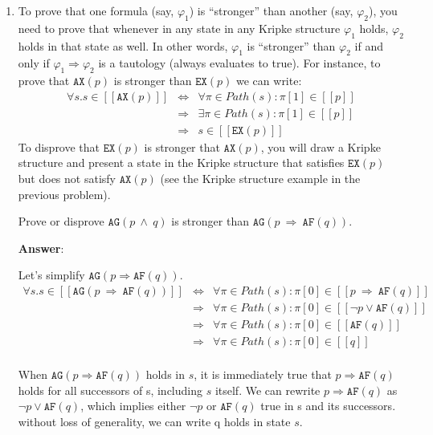 \documentclass[11pt]{article}
\newcommand{\ax}[1]{\texttt{AX}(#1)}
\newcommand{\ex}[1]{\texttt{EX}(#1)}
\newcommand{\af}[1]{\texttt{AF}(#1)}
\newcommand{\ag}[1]{\texttt{AG}(#1)}
\newcommand{\sem}[1]{[\!\![#1]\!\!]}
\begin{document}
\begin{enumerate}
\item
To prove that one formula (say, $\varphi_1$) is ``stronger'' than
another (say, $\varphi_2$), you need to prove that whenever in any
state in any Kripke structure $\varphi_1$ holds, $\varphi_2$ holds in
that state as well. In other words, $\varphi_1$ is ``stronger'' than
$\varphi_2$ if and only if $\varphi_1\Rightarrow\varphi_2$ is a
tautology (always evaluates to true). For instance, to prove that
$\ax{p}$ is stronger than $\ex{p}$ we can write:
\[
\begin{array}{rcl}
  \forall s. s\in \sem{\ax{p}} & \Leftrightarrow & \forall \pi\in Path(s): \pi[1] \in \sem{p} \\
                               & \Rightarrow &     \exists \pi\in Path(s): \pi[1] \in \sem{p} \\
                               & \Rightarrow & s \in \sem{\ex{p}}
\end{array}
\]
To disprove that $\ex{p}$ is stronger that $\ax{p}$, you will draw a
Kripke structure and present a state in the Kripke structure that
satisfies $\ex{p}$ but does not satisfy $\ax{p}$ (see the Kripke
structure example in the previous problem).

Prove or disprove $\ag{p\ \land\ q}$ is stronger than $\ag{p\ \Rightarrow\ \af{q}}$.

\textbf{Answer}:

Let's simplify $\ag{p \Rightarrow \af{q}}$. 
\[
\begin{array}{rcl}
  \forall s. s\in \sem{\ag{p\ \Rightarrow\ \af{q}}} & \Leftrightarrow & \forall \pi\in Path(s): \pi[0] \in \sem{p\ \Rightarrow\ \af{q}} \\
                               & \Rightarrow &     \forall \pi\in Path(s): \pi[0] \in \sem{ \neg p \lor \af{q}} \\
                               & \Rightarrow &     \forall \pi\in Path(s): \pi[0] \in \sem{ \af{q}} \\
                               & \Rightarrow &     \forall \pi\in Path(s): \pi[0] \in \sem{ {q}} \\
\end{array}
\]

When $\ag{p \Rightarrow \af{q}}$ holds in $s$, it is immediately true that $p \Rightarrow \af{q}$ holds for all successors of s, including $s$ itself. We can rewrite $p \Rightarrow \af{q}$ as $\neg p \lor \af{q}$, which implies either $\neg p$ or $\af{q}$ true in s and its successors. without loss of generality, we can write q holds in state $s$. 


\end{enumerate}
\end{document}
